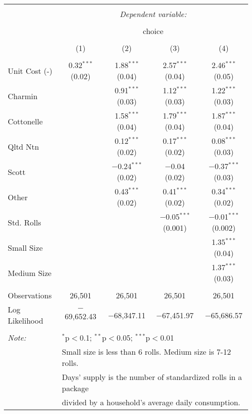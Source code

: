 
\begin{table}[!htbp] \centering 
  \caption{} 
  \label{tab:mnlCharlotteBaseline} 
\begin{tabular}{@{\extracolsep{5pt}}lcccc} 
\\[-1.8ex]\hline 
\hline \\[-1.8ex] 
 & \multicolumn{4}{c}{\textit{Dependent variable:}} \\ 
\cline{2-5} 
\\[-1.8ex] & \multicolumn{4}{c}{choice} \\ 
\\[-1.8ex] & (1) & (2) & (3) & (4)\\ 
\hline \\[-1.8ex] 
 Unit Cost (-) & 0.32$^{***}$ (0.02) & 1.88$^{***}$ (0.04) & 2.57$^{***}$ (0.04) & 2.46$^{***}$ (0.05) \\ 
  Charmin &  & 0.91$^{***}$ (0.03) & 1.12$^{***}$ (0.03) & 1.22$^{***}$ (0.03) \\ 
  Cottonelle &  & 1.58$^{***}$ (0.04) & 1.79$^{***}$ (0.04) & 1.87$^{***}$ (0.04) \\ 
  Qltd Ntn &  & 0.12$^{***}$ (0.02) & 0.17$^{***}$ (0.02) & 0.08$^{***}$ (0.03) \\ 
  Scott &  & $-$0.24$^{***}$ (0.02) & $-$0.04 (0.02) & $-$0.37$^{***}$ (0.03) \\ 
  Other &  & 0.43$^{***}$ (0.02) & 0.41$^{***}$ (0.02) & 0.34$^{***}$ (0.02) \\ 
  Std. Rolls &  &  & $-$0.05$^{***}$ (0.001) & $-$0.01$^{***}$ (0.002) \\ 
  Small Size &  &  &  & 1.35$^{***}$ (0.04) \\ 
  Medium Size &  &  &  & 1.37$^{***}$ (0.03) \\ 
 \hline \\[-1.8ex] 
Observations & 26,501 & 26,501 & 26,501 & 26,501 \\ 
Log Likelihood & $-$69,652.43 & $-$68,347.11 & $-$67,451.97 & $-$65,686.57 \\ 
\hline 
\hline \\[-1.8ex] 
\textit{Note:}  & \multicolumn{4}{l}{$^{*}$p$<$0.1; $^{**}$p$<$0.05; $^{***}$p$<$0.01} \\ 
 & \multicolumn{4}{l}{Small size is less than 6 rolls. Medium size is 7-12 rolls. } \\ 
 & \multicolumn{4}{l}{Days' supply is the number of standardized rolls in a package} \\ 
 & \multicolumn{4}{l}{divided by a household's average daily consumption.} \\ 
\end{tabular} 
\end{table} 
